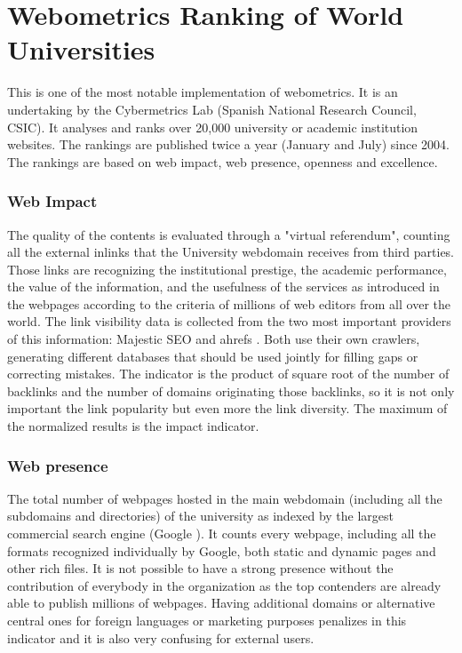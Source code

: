 \section{Webometrics Ranking of World Universities}
\noindent
This is one of the most notable implementation of webometrics. It is an undertaking by the Cybermetrics Lab (Spanish National Research Council, CSIC). It analyses and ranks over 20,000 university or academic institution websites. The rankings are published twice a year (January and July) since 2004. The rankings are based on web impact, web presence, openness and excellence.

\subsubsection{Web Impact}
\noindent
The quality of the contents is evaluated through a "virtual referendum", counting all the external inlinks that the University webdomain receives from third parties. Those links are recognizing the institutional prestige, the academic performance, the value of the information, and the usefulness of the services as introduced in the webpages according to the criteria of millions of web editors from all over the world. The link visibility data is collected from the two most important providers of this information: Majestic SEO and ahrefs . Both use their own crawlers, generating different databases that should be used jointly for filling gaps or correcting mistakes. The indicator is the product of square root of the number of backlinks and the number of domains originating those backlinks, so it is not only important the link popularity but even more the link diversity. The maximum of the normalized results is the impact indicator.

\subsubsection{Web presence}
\noindent
The total number of webpages hosted in the main webdomain (including all the subdomains and directories) of the university as indexed by the largest commercial search engine (Google ). It counts every webpage, including all the formats recognized individually by Google, both static and dynamic pages and other rich files. It is not possible to have a strong presence without the contribution of everybody in the organization as the top contenders are already able to publish millions of webpages. Having additional domains or alternative central ones for foreign languages or marketing purposes penalizes in this indicator and it is also very confusing for external users.

